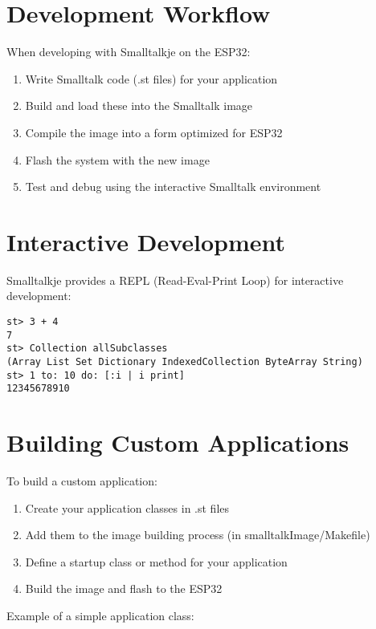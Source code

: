 \documentclass[12pt,a4paper]{report}
\begin{document}
\section{Development Workflow}

When developing with Smalltalkje on the ESP32:

\begin{enumerate}
    \item Write Smalltalk code (.st files) for your application
    \item Build and load these into the Smalltalk image
    \item Compile the image into a form optimized for ESP32
    \item Flash the system with the new image
    \item Test and debug using the interactive Smalltalk environment
\end{enumerate}

\section{Interactive Development}

Smalltalkje provides a REPL (Read-Eval-Print Loop) for interactive development:

\begin{lstlisting}[style=smalltalk]
st> 3 + 4
7
st> Collection allSubclasses
(Array List Set Dictionary IndexedCollection ByteArray String)
st> 1 to: 10 do: [:i | i print]
12345678910
\end{lstlisting}

\section{Building Custom Applications}

To build a custom application:

\begin{enumerate}
    \item Create your application classes in .st files
    \item Add them to the image building process (in smalltalkImage/Makefile)
    \item Define a startup class or method for your application
    \item Build the image and flash to the ESP32
\end{enumerate}

Example of a simple application class:
\end{document}
